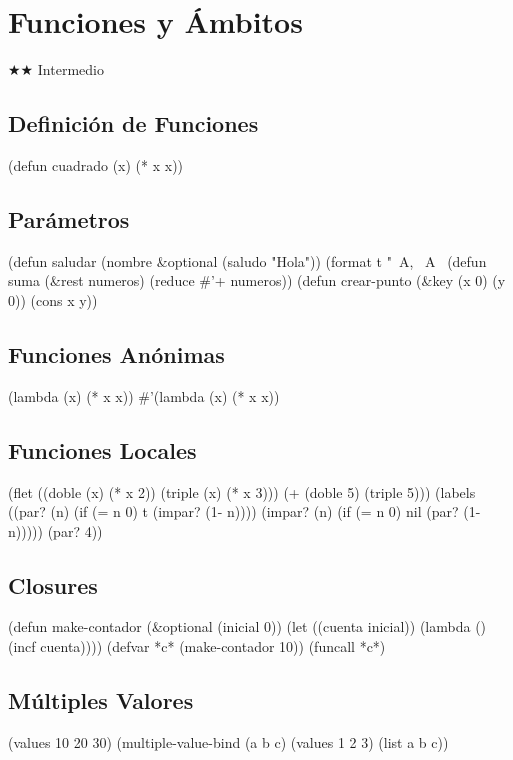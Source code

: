 \chapter{Funciones y Ámbitos}
\label{chap:functions}
{\huge$\bigstar$}{\huge$\bigstar$} Intermedio

\section{Definición de Funciones}
\begin{lispcode}
(defun cuadrado (x) (* x x))
\end{lispcode}

\section{Parámetros}
\begin{lispcode}
(defun saludar (nombre &optional (saludo "Hola"))
  (format t "~A, ~A~%
(defun suma (&rest numeros) (reduce #'+ numeros))
(defun crear-punto (&key (x 0) (y 0)) (cons x y))
\end{lispcode}

\section{Funciones Anónimas}
\begin{lispcode}
(lambda (x) (* x x))
#'(lambda (x) (* x x))
\end{lispcode}

\section{Funciones Locales}
\begin{lispcode}
(flet ((doble (x) (* x 2)) (triple (x) (* x 3))) (+ (doble 5) (triple 5)))
(labels ((par? (n) (if (= n 0) t (impar? (1- n))))
         (impar? (n) (if (= n 0) nil (par? (1- n)))))
  (par? 4))
\end{lispcode}

\section{Closures}
\begin{lispcode}
(defun make-contador (&optional (inicial 0))
  (let ((cuenta inicial)) (lambda () (incf cuenta))))
(defvar *c* (make-contador 10))
(funcall *c*)
\end{lispcode}

\section{Múltiples Valores}
\begin{lispcode}
(values 10 20 30)
(multiple-value-bind (a b c) (values 1 2 3) (list a b c))
\end{lispcode}

